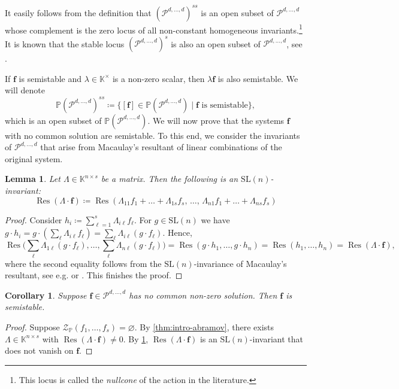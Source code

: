 \documentclass[11pt,a4paper]{article}
\newtheorem{corollary}[theorem]{Corollary}\AddToHook{env/corollary/begin}{\crefalias{theorem}{corollary}}
\newtheorem{lemma}[theorem]{Lemma}\AddToHook{env/lemma/begin}{\crefalias{theorem}{lemma}}
\numberwithin{equation}{section}
\newcommand{\PP}{\mathbb{P}}
\newcommand{\KK}{\mathbb{K}}
\newcommand{\cP}{\mathcal{P}}
\newcommand{\cZ}{\mathcal{Z}}
\newcommand{\ff}{\ensuremath{\boldsymbol{f}}}
\newcommand{\SL}{\mathrm{SL}}
\DeclareMathOperator{\Res}{Res}
\begin{document}
It easily follows from the definition that $(\cP^{d,\dots,d})^{ss}$ is an open subset of $\cP^{d,\dots,d}$ whose complement is the zero locus of all non-constant homogeneous invariants.\footnote{This locus is called the \emph{nullcone} of the action in the literature.}
It is known that the stable locus $(\cP^{d,\dots,d})^s$ is also an open subset of $\cP^{d,\dots,d}$, see \cite[Proposition~3.19]{Hoskins-12}.

If $\ff$ is semistable and $\lambda\in\KK^{\times}$ is a non-zero scalar, then $\lambda\ff$ is also semistable.
We will denote \[
\PP(\cP^{d,\dots,d})^{ss}\coloneqq \{[\ff]\in\PP(\cP^{d,\dots,d})\mid \ff\text{ is semistable}\},
\] which is an open subset of $\PP(\cP^{d,\dots,d})$.
We will now prove that the systems $\ff$ with no common solution are semistable.
To this end, we consider the invariants of $\cP^{d,\dots,d}$ that arise from Macaulay's resultant of linear combinations of the original system.
\begin{lemma}
\label{lem:resultant-invariance}
    Let $\Lambda\in\KK^{n\times s}$ be a matrix.
    Then the following is an $\SL(n)$-invariant: \[
    \Res(\Lambda\cdot\ff)\coloneqq \Res(\Lambda_{11}f_1+\dots+\Lambda_{1s}f_s,\,\dots,\, \Lambda_{n1}f_1+\dots+\Lambda_{ns}f_s)
    \] 
\end{lemma}
\begin{proof}
   Consider $h_i\coloneqq \sum_{\ell=1}^s \Lambda_{i\ell} f_\ell$.
    For $g\in\SL(n)$ we have $g\cdot h_i = g\cdot (\sum_{\ell}\Lambda_{i\ell} f_\ell)=\sum_{\ell}\Lambda_{i\ell}(g\cdot f_\ell)$.
    Hence,
    \[
    \Res\big(\sum_{\ell}\Lambda_{1\ell} (g\cdot f_\ell), \dots, \sum_{\ell}\Lambda_{n\ell} (g\cdot f_\ell)\big) = \Res(g\cdot h_1,\dots,g\cdot h_n) = \Res(h_1,\dots,h_n)=\Res(\Lambda\cdot\ff),
    \] where the second equality follows from the $\SL(n)$-invariance of Macaulay's resultant, see e.g. \cite[Theorem (3.5)]{Cox-Little-Oshea-05} or \cite[\S~5.13]{Jouanolou-91}.
    This finishes the proof.
\end{proof}
\begin{corollary}
\label{cor:semistable}
    Suppose $\ff\in\cP^{d,\dots,d}$ has no common non-zero solution.
    Then $\ff$ is semistable.
\end{corollary}
\begin{proof}
Suppose $\cZ_{\PP}(f_1,\dots,f_s)=\varnothing$.
    By \cref{thm:intro-abramov}, there exists $\Lambda\in\KK^{n\times s}$ with $\Res(\Lambda\cdot \ff)\neq 0$.
    By \cref{lem:resultant-invariance}, $\Res(\Lambda\cdot\ff)$ is an $\SL(n)$-invariant that does not vanish on $\ff$.
\end{proof}
\end{document}
